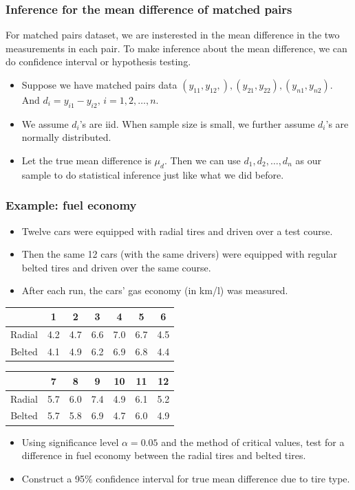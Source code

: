 \documentclass[handout]{beamer}\usepackage[]{graphicx}\usepackage[]{color}
\numberwithin{equation}{section}
\begin{document}
\begin{frame}
\frametitle{Inference for the mean difference of matched pairs}
For matched pairs dataset, we are insterested in the mean difference in the two measurements in each pair. To make inference about the mean difference, we can do confidence interval or hypothesis testing.

\begin{itemize}
\item
Suppose we have matched pairs data $(y_{11}, y_{12},), (y_{21}, y_{22}), (y_{n1}, y_{n2})$. And $d_i = y_{i1} - y_{i2},\, i = 1, 2, \ldots, n$. 
\item
We assume $d_i$'s are iid. When sample size is small, we further assume $d_i$'s are normally distributed.
\item
Let the true mean difference is $\mu_d$. Then we can use $d_1, d_2, \ldots, d_n$ as our sample to do statistical inference just like what we did before. 
\end{itemize}
\end{frame}












\begin{frame}
\frametitle{Example: fuel economy} \scriptsize
\begin{itemize}
\item  Twelve cars were equipped with radial tires and driven over a test course.  
\pause \item Then the same 12 cars (with the same drivers) were equipped with regular belted tires and driven over the same course.  
\pause \item After each run, the cars' gas economy (in km/l) was measured.  
\end{itemize}
\begin{center}
\begin{tabular}{ccccccc}
 & 1 & 2 & 3 & 4 & 5& 6 \\ \hline
Radial & 4.2 &4.7 &6.6 &7.0 &6.7& 4.5  \\ 
Belted & 4.1 &4.9 &6.2 &6.9 &6.8 &4.4  \\ 
\end{tabular} 
\begin{tabular}{ccccccc}
 & 7 & 8 & 9 & 10 & 11 & 12 \\ \hline
Radial & 5.7 &6.0& 7.4 &4.9 &6.1 & 5.2  \\ 
Belted &5.7 &5.8 &6.9& 4.7 &6.0 &4.9 \\ 
\end{tabular}
\end{center}
\begin{itemize}
\pause \item Using significance level $\alpha = 0.05$ and the method of critical values, test for a difference in fuel economy between the radial tires and belted tires.
\pause \item Construct a 95\% confidence interval for true mean difference due to tire type.
\end{itemize}
\end{frame}
\end{document}
